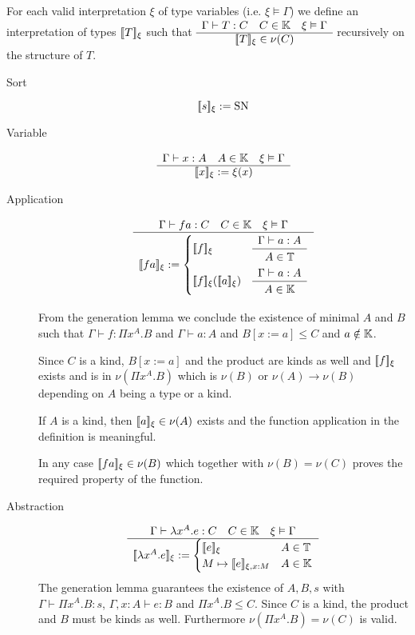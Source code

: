 \begin{definition}
  For each valid interpretation $\xi$ of type variables (i.e. $\xi \vDash
  \Gamma$) we define an interpretation of types
  $[\![T]\!]_\xi$ such that
  $
  \begin{array}{c} \Gamma \vdash T: C
    \quad
    C \in \mathbb{K}
    \quad
    \xi \vDash \Gamma \\ \hline [\![T]\!]_\xi \in \nu(C)\end{array}
  $
  recursively on the structure of $T$.

  \begin{description}

  \item[Sort] $$[\![s]\!]_\xi := \text{SN}$$

  \item[Variable]
    $$
    \begin{array}{c} \Gamma \vdash x:A \quad A \in \mathbb{K} \quad \xi \vDash \Gamma \\ \hline [\![x]\!]_\xi := \xi(x)\end{array}
    $$

  \item[Application]
    $$
    \ruleh
    {\Gamma \vdash f a : C
      \quad
      C \in \Kinds
      \quad
      \xi \vDash \Gamma
    }
    {\dbrack{f a}_\xi :=
      \begin{cases}
        \dbrack{f}_\xi &
        \ruleh{\Gamma \vdash a:A}{A\in \Types}
        \\
        \dbrack{f}_\xi ( \dbrack{a}_\xi ) &
        \ruleh{\Gamma \vdash a:A}{A\in \Kinds}
      \end{cases}
    }
    $$

    From the generation lemma we conclude the existence of minimal $A$ and $B$
    such that $\Gamma \vdash f: \Pi x^A.B$ and $\Gamma \vdash a:A$ and
    $B[x:=a] \le C$ and $a \notin \mathbb{K}$.

    Since $C$ is a kind, $B[x:=a]$ and the product are kinds as well and
    $[\![f]\!]_\xi$ exists and is in $\nu (\Pi x^A.B)$ which is $\nu(B)$ or
    $\nu(A) \to \nu(B)$ depending on $A$ being a type or a kind.

    If $A$ is a kind, then $[\![a]\!]_\xi \in \nu(A)$ exists and the function
    application in the definition is meaningful.

    In any case $[\![f a]\!]_\xi \in \nu(B)$ which together with $\nu(B) =
    \nu(C)$ proves the required property of the function.


  \item[Abstraction]
    $$
    \begin{array}{c} \Gamma \vdash \lambda x^A. e: C \quad C \in \mathbb{K} \quad \xi \vDash \Gamma \\ \hline [\![\lambda x^A. e]\!]_\xi
      :=
      \begin{cases}
        [\![e]\!]_\xi & A \in \mathbb{T}
        \\
        M \mapsto [\![e]\!]_{\xi,x:M} & A \in \mathbb{K}
      \end{cases}
    \end{array}
    $$
    The generation lemma guarantees the existence of $A,B,s$ with $\Gamma
    \vdash \Pi x^A.B : s$, $\Gamma,x:A \vdash e:B$ and $\Pi x^A.B \le
    C$. Since $C$ is a kind, the product and $B$ must be kinds as
    well. Furthermore $\nu(\Pi x^A.B) = \nu(C)$ is valid.


\end{description}
\end{definition}
